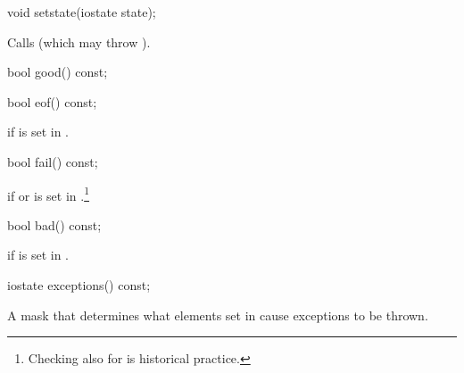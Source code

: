 %
\begin{itemdecl}
void setstate(iostate state);
\end{itemdecl}

\begin{itemdescr}
\pnum
\effects
Calls
(which may throw
).
\end{itemdescr}

%
\begin{itemdecl}
bool good() const;
\end{itemdecl}

\begin{itemdescr}
\pnum
\returns
{}
\end{itemdescr}

%
\begin{itemdecl}
bool eof() const;
\end{itemdecl}

\begin{itemdescr}
\pnum
\returns
{}
if
is set in
.
\end{itemdescr}

%
\begin{itemdecl}
bool fail() const;
\end{itemdecl}

\begin{itemdescr}
\pnum
\returns
{}
if
or
is set in
.\footnote{Checking
also for
is historical practice.}
\end{itemdescr}

%
\begin{itemdecl}
bool bad() const;
\end{itemdecl}

\begin{itemdescr}
\pnum
\returns
{}
if
is set in
.
\end{itemdescr}

%
\begin{itemdecl}
iostate exceptions() const;
\end{itemdecl}

\begin{itemdescr}
\pnum
\returns
A mask that determines what elements set in
cause exceptions to be thrown.
\end{itemdescr}

